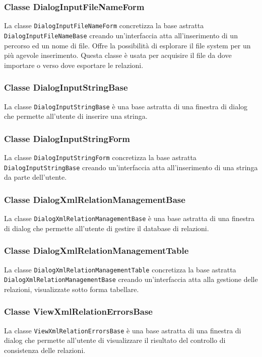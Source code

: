 	\subsubsection{Classe DialogInputFileNameForm}
		La classe \texttt{DialogInputFileNameForm} concretizza la base astratta \texttt{DialogInputFileNameBase} creando un'interfaccia atta all'inserimento di un percorso ed un nome di file. Offre la possibilità di esplorare il file system per un più agevole inserimento. Questa classe è usata per acquisire il file da dove importare o verso dove esportare le relazioni.

	\subsubsection{Classe DialogInputStringBase}
		La classe \texttt{DialogInputStringBase} è una base astratta di una finestra di dialog che permette all'utente di inserire una stringa.
		
	\subsubsection{Classe DialogInputStringForm}
		La classe \texttt{DialogInputStringForm} concretizza la base astratta \texttt{DialogInputStringBase} creando un'interfaccia atta all'inserimento di una stringa da parte dell'utente.
	
	\subsubsection{Classe DialogXmlRelationManagementBase}
	La classe \texttt{DialogXmlRelationManagementBase} è una base astratta di una finestra di dialog che permette all'utente di gestire il database di relazioni.
	
	\subsubsection{Classe DialogXmlRelationManagementTable}
	La classe \texttt{DialogXmlRelationManagementTable} concretizza la base astratta \texttt{DialogXmlRelationManagementBase} creando un'interfaccia atta alla gestione delle relazioni, visualizzate sotto forma tabellare.

	\subsubsection{Classe ViewXmlRelationErrorsBase}
		La classe \texttt{ViewXmlRelationErrorsBase} è una base astratta di una finestra di dialog che permette all'utente di visualizzare il risultato del controllo di consistenza delle relazioni.
		
